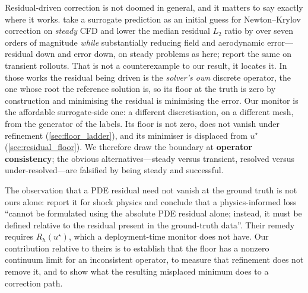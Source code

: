 Residual-driven correction is not doomed in general, and it matters to say exactly where
it works. \citet{lei2026newtonkrylov} take a surrogate prediction as an initial guess
for Newton--Krylov correction on \emph{steady} CFD and lower the median residual $L_2$
ratio by over seven orders of magnitude \emph{while} substantially reducing field and
aerodynamic error---residual down and error down, on steady problems as here;
\citet{huang2025physicscorrect} report the same on transient rollouts. That is not a
counterexample to our result, it locates it. In those works the residual being driven is
the \emph{solver's own} discrete operator, the one whose root the reference solution is,
so its floor at the truth is zero by construction and minimising the residual is
minimising the error. Our monitor is the affordable surrogate-side one: a different
discretisation, on a different mesh, from the generator of the labels. Its floor is not
zero, does not vanish under refinement (\autoref{sec:floor_ladder}), and its minimiser is
displaced from $u^\star$ (\autoref{sec:residual_floor}). We therefore draw the boundary
at \textbf{operator consistency}; the obvious alternatives---steady versus transient,
resolved versus under-resolved---are falsified by \citet{lei2026newtonkrylov} being
steady and successful.

The observation that a PDE residual need not vanish at the ground truth is not ours
alone: \citet{zhang2026phymgn} report it for shock physics and conclude that a
physics-informed loss ``cannot be formulated using the absolute PDE residual alone;
instead, it must be defined relative to the residual present in the ground-truth
data''. Their remedy requires $R_h(u^\star)$, which a deployment-time monitor does not
have. Our contribution relative to theirs is to establish that the floor has a nonzero
continuum limit for an inconsistent operator, to measure that refinement does not remove
it, and to show what the resulting misplaced minimum does to a correction path.



